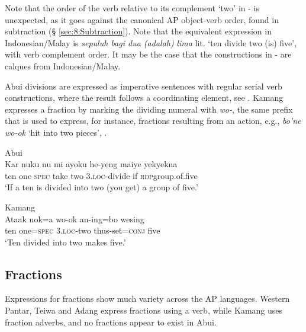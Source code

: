  

  

Note that the order of the verb relative to its complement `two' in - is unexpected, as it goes against the canonical AP object-verb order, found in subtraction ({\S} \ref{sec:8:Subtraction}). Note that the equivalent expression in Indonesian/Malay is \textit{sepuluh bagi dua (adalah)} \textit{lima} lit. `ten divide two (is) five', with verb complement order. It may be the case that the constructions in - are calques from Indonesian/Malay. 

Abui divisions are expressed as imperative sentences with regular serial verb constructions, where the result follows a coordinating element, see . Kamang expresses a fraction by marking the dividing numeral with \textit{wo-}, the same prefix that is used to express, for instance, fractions resulting from an action, e.g., \textit{bo'ne wo-ok} `hit into two pieces', . 


\ea%
\label{bkm:Ref358116296}
{\upshape Abui}\\
\gll  Kar  nuku  nu  mi  ayoku  he-yeng  maiye  yek{\Tilde}yekna \\  
    ten  one  \textsc{spec}  take  two  3.\textsc{loc-}divide  if  \textsc{rdp}{\Tilde}group.of.five \\
\glt  `If a ten is divided into two (you get) a group of five.'
\z



 




\ea
\label{ex:8:1247}
{\upshape Kamang}\\
 \gll Ataak  nok=a  wo-ok  an-ing=bo  wesing \\
  ten  one=\textsc{spec}  \textsc{3.loc}-two  thus-set=\textsc{conj}  five \\
 \glt`Ten divided into two makes five.'
\z


\subsection{Fractions}
\label{sec:8:Fractions}
Expressions for fractions show much variety across the AP languages. Western Pantar, Teiwa and Adang express fractions using a verb, while Kamang uses fraction adverbs, and no fractions appear to exist in Abui. 

